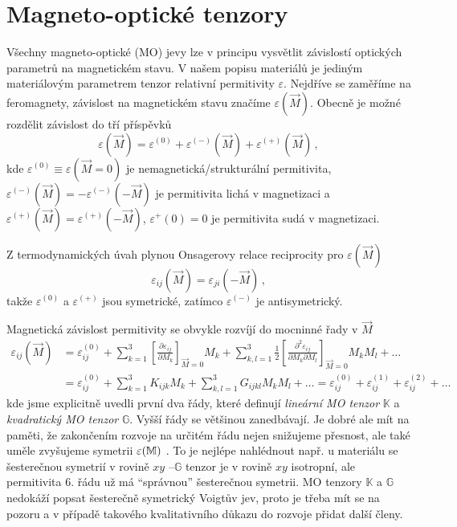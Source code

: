 \section{Magneto-optické tenzory}
\label{chap:magnetoopticke-tenzory}

Všechny magneto-optické (MO) jevy lze v principu vysvětlit závislostí optických parametrů na magnetickém stavu.
V našem popisu materiálů je jediným materiálovým parametrem tenzor relativní permitivity $\varepsilon$.
Nejdříve se zaměříme na feromagnety, závislost na magnetickém stavu značíme $\varepsilon(\vec{M})$.
Obecně je možné rozdělit závislost do tří příspěvků
\begin{equation}
    \varepsilon(\vec{M})=\varepsilon^{(0)} + \varepsilon^{(-)}(\vec{M}) + \varepsilon^{(+)}(\vec{M}) \,,
\end{equation}
kde $\varepsilon^{(0)}\equiv \varepsilon(\vec{M}=0)$ je nemagnetická/strukturální permitivita,
$\varepsilon^{(-)}(\vec{M})=-\varepsilon^{(-)}(-\vec{M})$ je permitivita lichá v magnetizaci
a $\varepsilon^{(+)}(\vec{M})=\varepsilon^{(+)}(-\vec{M})$, $\varepsilon^+(0)=0$ je permitivita sudá v magnetizaci.

Z termodynamických úvah plynou Onsagerovy relace reciprocity pro $\varepsilon(\vec{M})$
\begin{equation}
    \varepsilon_{ij}(\vec{M})=\varepsilon_{ji}(-\vec{M}) \,,
\end{equation}
takže $\varepsilon^{(0)}$ a $\varepsilon^{(+)}$ jsou symetrické, zatímco $\varepsilon^{(-)}$ je antisymetrický.

Magnetická závislost permitivity se obvykle rozvíjí do mocninné řady v $\vec{M}$
\begin{align} 
\label{eqn:MO-tenzory}
    \varepsilon_{ij}(\vec{M})&=\varepsilon^{(0)}_{ij}
        + \sum_{k=1}^{3}\left[ \frac{\partial \varepsilon_{ij}}{\partial M_k}\right]_{\vec{M}=0} M_k 
        + \sum_{k,l=1}^{3} \frac{1}{2}\left[ \frac{\partial^2 \varepsilon_{ij}}{\partial M_k \partial M_l}\right]_{\vec{M}=0} M_k M_l + \dots 
    \\ &=\varepsilon^{(0)}_{ij} 
        + \sum_{k=1}^{3}K_{ijk} M_k 
        + \sum_{k,l=1}^{3} G_{ijkl} M_k M_l + \dots
        =\varepsilon^{(0)}_{ij} +\varepsilon^{(1)}_{ij} +\varepsilon^{(2)}_{ij} + \dots
\end{align}
kde jsme explicitně uvedli první dva řády, které definují \emph{lineární MO tenzor} $\mathbb{K}$ a \emph{kvadratický MO tenzor} $\mathbb{G}$. 
Vyšší řády se většinou zanedbávají.
Je dobré ale mít na paměti, že zakončením rozvoje na určitém řádu nejen snižujeme přesnost, ale také uměle zvyšujeme symetrii $\varepsilon(\mathbb{M})$ .
To je nejlépe nahlédnout např. u materiálu se šesterečnou symetrií v rovině $xy$ --\tododash $\mathbb{G}$ tenzor je v rovině $xy$ isotropní, ale permitivita 6. řádu už má ``správnou'' šesterečnou symetrii.
MO tenzory $\mathbb{K}$ a $\mathbb{G}$ nedokáží popsat šesterečně symetrický Voigtův jev, proto je třeba mít se na pozoru a v případě takového kvalitativního důkazu do rozvoje přidat další členy.


